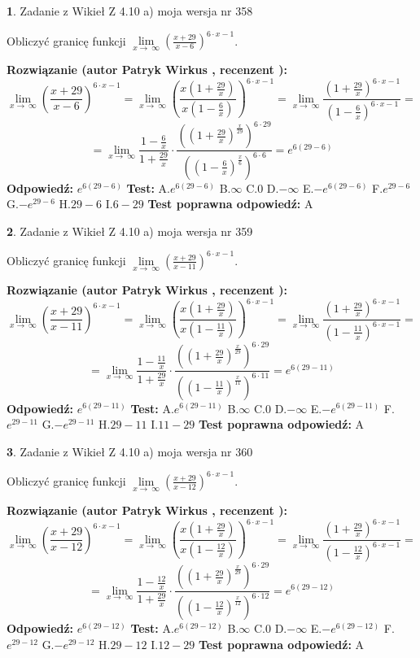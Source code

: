 \documentclass[12pt, a4paper]{article}
\theoremstyle{definition} %
\newtheorem{zad}{}
\newcommand{\zadStart}[1]{\begin{zad}#1\newline}
\newcommand{\zadStop}{\end{zad}}
\newcommand{\rozwStart}[2]{\noindent \textbf{Rozwiązanie (autor #1 , recenzent #2): }\newline}
\newcommand{\rozwStop}{\newline}
\newcommand{\odpStart}{\noindent \textbf{Odpowiedź:}\newline}
\newcommand{\odpStop}{\newline}
\newcommand{\testStart}{\noindent \textbf{Test:}\newline}
\newcommand{\testStop}{\newline}
\newcommand{\kluczStart}{\noindent \textbf{Test poprawna odpowiedź:}\newline}
\newcommand{\kluczStop}{\newline}
\begin{document}
\zadStart{Zadanie z Wikieł Z 4.10 a) moja wersja nr 358}


Obliczyć granicę funkcji  $\lim\limits_{x\to\ \infty}(\frac{x+29}{x-6})^{6\cdot x-1}$.
\zadStop
\rozwStart{Patryk Wirkus}{}
$$\lim\limits_{x\to\ \infty}(\frac{x+29}{x-6})^{6\cdot x-1} = \lim\limits_{x\to\ \infty}(\frac{x(1+\frac{29}{x})}{x(1-\frac{6}{x})})^{6\cdot x-1}=\lim\limits_{x\to\ \infty}\frac{(1+\frac{29}{x})^{6\cdot x-1}}{(1-\frac{6}{x})^{6\cdot x-1}}=$$
$$=\lim\limits_{x\to\ \infty}\frac{1-\frac{6}{x}}{1+\frac{29}{x}}\cdot\frac{((1+\frac{29}{x})^{\frac{x}{29}})^{6\cdot29}}{((1-\frac{6}{x})^{\frac{x}{6}})^{6\cdot6}}=e^{6(29-6)}$$
\rozwStop
\odpStart
$e^{6(29-6)}$
\odpStop
\testStart
A.$e^{6(29-6)}$ B.$\infty$ C.$0$ D.$-\infty$ E.$-e^{6(29-6)}$
F.$e^{29-6}$ G.$-e^{29-6}$
H.$29-6$
I.$6-29$
\testStop
\kluczStart
A
\kluczStop



\zadStart{Zadanie z Wikieł Z 4.10 a) moja wersja nr 359}


Obliczyć granicę funkcji  $\lim\limits_{x\to\ \infty}(\frac{x+29}{x-11})^{6\cdot x-1}$.
\zadStop
\rozwStart{Patryk Wirkus}{}
$$\lim\limits_{x\to\ \infty}(\frac{x+29}{x-11})^{6\cdot x-1} = \lim\limits_{x\to\ \infty}(\frac{x(1+\frac{29}{x})}{x(1-\frac{11}{x})})^{6\cdot x-1}=\lim\limits_{x\to\ \infty}\frac{(1+\frac{29}{x})^{6\cdot x-1}}{(1-\frac{11}{x})^{6\cdot x-1}}=$$
$$=\lim\limits_{x\to\ \infty}\frac{1-\frac{11}{x}}{1+\frac{29}{x}}\cdot\frac{((1+\frac{29}{x})^{\frac{x}{29}})^{6\cdot29}}{((1-\frac{11}{x})^{\frac{x}{11}})^{6\cdot11}}=e^{6(29-11)}$$
\rozwStop
\odpStart
$e^{6(29-11)}$
\odpStop
\testStart
A.$e^{6(29-11)}$ B.$\infty$ C.$0$ D.$-\infty$ E.$-e^{6(29-11)}$
F.$e^{29-11}$ G.$-e^{29-11}$
H.$29-11$
I.$11-29$
\testStop
\kluczStart
A
\kluczStop



\zadStart{Zadanie z Wikieł Z 4.10 a) moja wersja nr 360}


Obliczyć granicę funkcji  $\lim\limits_{x\to\ \infty}(\frac{x+29}{x-12})^{6\cdot x-1}$.
\zadStop
\rozwStart{Patryk Wirkus}{}
$$\lim\limits_{x\to\ \infty}(\frac{x+29}{x-12})^{6\cdot x-1} = \lim\limits_{x\to\ \infty}(\frac{x(1+\frac{29}{x})}{x(1-\frac{12}{x})})^{6\cdot x-1}=\lim\limits_{x\to\ \infty}\frac{(1+\frac{29}{x})^{6\cdot x-1}}{(1-\frac{12}{x})^{6\cdot x-1}}=$$
$$=\lim\limits_{x\to\ \infty}\frac{1-\frac{12}{x}}{1+\frac{29}{x}}\cdot\frac{((1+\frac{29}{x})^{\frac{x}{29}})^{6\cdot29}}{((1-\frac{12}{x})^{\frac{x}{12}})^{6\cdot12}}=e^{6(29-12)}$$
\rozwStop
\odpStart
$e^{6(29-12)}$
\odpStop
\testStart
A.$e^{6(29-12)}$ B.$\infty$ C.$0$ D.$-\infty$ E.$-e^{6(29-12)}$
F.$e^{29-12}$ G.$-e^{29-12}$
H.$29-12$
I.$12-29$
\testStop
\kluczStart
A
\kluczStop
\end{document}
